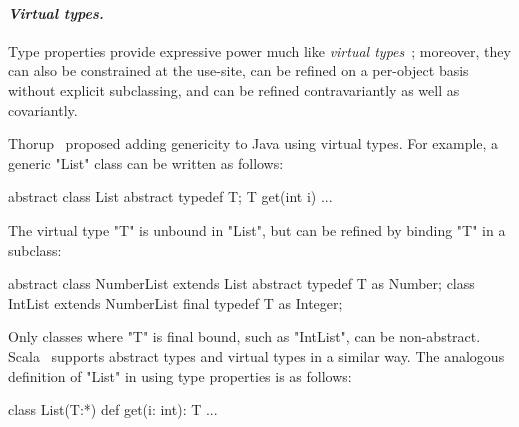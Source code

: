 
\paragraph{\normalfont\bf\em Virtual types.}

Type properties provide expressive power much like 
\emph{virtual
types}~\cite{beta,mp89-virtual-classes,ernst06-virtual};
moreover, they can also
be constrained at the use-site,
can be refined on a per-object basis without explicit subclassing,
and can be refined contravariantly as well as covariantly.

Thorup~\cite{thorup97}
proposed adding genericity to Java using virtual types.  For example,
a generic \xcd"List" class can be written as follows:
{
\begin{xten}
abstract class List {
  abstract typedef T;
  T get(int i) { ... }
}
\end{xten}}
\noindent
The virtual type \xcd"T" is unbound in \xcd"List", but 
can be refined by binding \xcd"T" in a subclass:
{
\begin{xten}
abstract class NumberList extends List {
  abstract typedef T as Number;
}
class IntList extends NumberList {
  final typedef T as Integer;
}
\end{xten}}
\noindent
Only classes where \xcd"T" is final bound, such as \xcd"IntList",
can be non-abstract.  Scala~\cite{scala} supports abstract types
and virtual types in a similar way.
%
The analogous definition of 
\xcd"List" in \Xten{} using type properties is as follows:
{
\begin{xten}
class List(T:*) {
  def get(i: int): T { ... }
}
\end{xten}}

